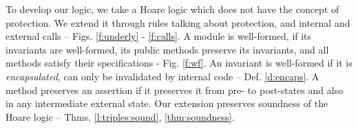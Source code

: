 To develop our logic, we   take  a  Hoare logic %
which does not {have} the concept of protection.
We  extend it through %
rules talking about protection, and internal and external calls 
-- \cf Figs. \ref{f:underly} -  \ref{f:calls}. %
A module is well-formed, if  its invariants are well-formed,    its public methods preserve   its invariants, and  all  methods satisfy their specifications - \cf  Fig.  \ref{f:wf}.
An invariant is well-formed if   it is \emph{encapsulated}, \ie can only be invalidated by internal code
-- \cf Def. \ref{d:encaps}. 
A method preserves an assertion   if it preserves it   from pre- to  post-states and also in any intermediate external state.
 Our extension preserves soundness of the  Hoare logic --  \cf   
 Thms.  \ref{l:triples:sound},  \ref{thm:soundness}.





